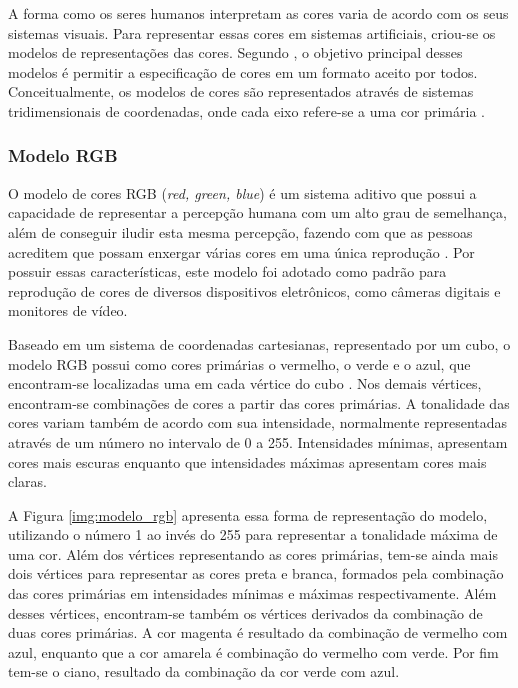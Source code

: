 A forma como os seres humanos interpretam as cores varia de acordo com os seus sistemas visuais. Para representar essas cores em sistemas artificiais, criou-se os modelos de representações das cores. Segundo , o objetivo principal desses modelos é permitir a especificação de cores em um formato aceito por todos. Conceitualmente, os modelos de cores são representados através de sistemas tridimensionais de coordenadas, onde cada eixo refere-se a uma cor primária \cite{FOLEY}.

\subsubsection{Modelo RGB}

O modelo de cores RGB (\textit{red, green, blue}) é um sistema aditivo que possui a capacidade de representar a percepção humana com um alto grau de semelhança, além de conseguir iludir esta mesma percepção, fazendo com que as pessoas acreditem que possam enxergar várias cores em uma única reprodução \cite{FRED}. Por possuir essas características, este modelo foi adotado como padrão para reprodução de cores de diversos dispositivos eletrônicos, como câmeras digitais e monitores de vídeo.

Baseado em um sistema de coordenadas cartesianas, representado por um cubo, o modelo RGB possui como cores primárias o vermelho, o verde e o azul, que encontram-se localizadas uma em cada vértice do cubo \cite{OGE}. Nos demais vértices, encontram-se combinações de cores a partir das cores primárias. A tonalidade das cores variam também de acordo com sua intensidade, normalmente representadas através de um número no intervalo de 0 a 255. Intensidades mínimas, apresentam cores mais escuras enquanto que intensidades máximas apresentam cores mais claras.

A Figura \ref{img:modelo_rgb} apresenta essa forma de representação do modelo, utilizando o número 1 ao invés do 255 para representar a tonalidade máxima de uma cor. Além dos vértices representando as cores primárias, tem-se ainda mais dois vértices para representar as cores preta e branca, formados pela combinação das cores primárias em intensidades mínimas e máximas respectivamente. Além desses vértices, encontram-se também os vértices derivados da combinação de duas cores primárias. A cor magenta é resultado da combinação de vermelho com azul, enquanto que a cor amarela é combinação do vermelho com verde. Por fim tem-se o ciano, resultado da combinação da cor verde com azul.

